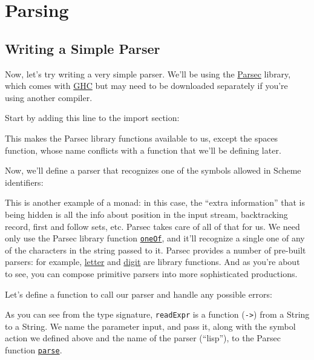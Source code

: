 \chapter{Parsing}
 
 
\section{Writing a Simple Parser}
 
Now, let's try writing a very simple parser. We'll be using the \href{http://www.cs.uu.nl/~daan/download/parsec/parsec.html}{Parsec} library, which comes with \href{http://www.haskell.org/ghc}{GHC} but may need to be downloaded separately if you're using another compiler.
 
Start by adding this line to the import section:
 
 
This makes the Parsec library functions available to us, except the spaces function, whose name conflicts with a function that we'll be defining later.
 
Now, we'll define a parser that recognizes one of the symbols allowed in Scheme identifiers:
 
 
This is another example of a monad: in this case, the ``extra information'' that is being hidden is all the info about position in the input stream, backtracking record, first and follow sets, etc. Parsec takes care of all of that for us. We need only use the Parsec library function \href{http://www.cs.uu.nl/~daan/download/parsec/parsec.html\#oneOf}{\texttt{oneOf}}, and it'll recognize a single one of any of the characters in the string passed to it. Parsec provides a number of pre-built parsers: for example, \href{http://www.cs.uu.nl/~daan/download/parsec/parsec.html\#letter}{letter} and \href{http://www.cs.uu.nl/~daan/download/parsec/parsec.html\#digit}{digit} are library functions. And as you're about to see, you can compose primitive parsers into more sophisticated productions.
 
Let's define a function to call our parser and handle any possible errors:
 
 
As you can see from the type signature, \verb|readExpr| is a function (\lstinline|->|) from a String to a String. We name the parameter input, and pass it, along with the symbol action we defined above and the name of the parser (``lisp''), to the Parsec function \href{http://www.cs.uu.nl/~daan/download/parsec/parsec.html\#parse}{\texttt{parse}}.
 
